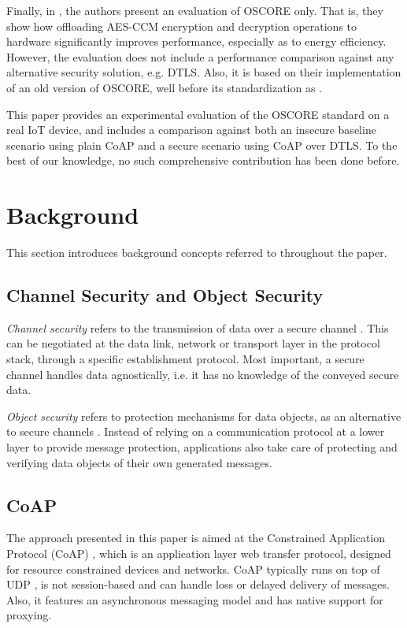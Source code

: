{Finally, in \cite{musaddiq2018}, the authors present an evaluation of OSCORE only. That is, they show how offloading AES-CCM encryption and decryption operations to hardware significantly improves performance, especially as to energy efficiency. However, the evaluation does not include a performance comparison against any alternative security solution, e.g. DTLS. Also, it is based on their implementation of an old version of OSCORE, well before its standardization as \cite{cite:oscoap}. 

This paper provides an experimental evaluation of the OSCORE standard on a real IoT device, and includes a comparison against both an insecure baseline scenario using plain CoAP and a secure scenario using CoAP over DTLS. To the best of our knowledge, no such comprehensive contribution has been done before.

\section{Background}
\label{sec:back}

This section introduces background concepts referred to throughout the paper.

\subsection{Channel Security and Object Security }
\emph{Channel security} refers to the transmission of data over a secure channel \cite{rfc3552}. This can be negotiated at the data link, network or transport layer in the protocol stack, through a specific establishment protocol. Most important, a secure channel handles data agnostically, i.e. it has no knowledge of the conveyed secure data.

\emph{Object security} refers to protection mechanisms for data objects, as an alternative to secure channels \cite{rfc3552}. Instead of relying on a communication protocol at a lower layer to provide message protection, applications also take care of protecting and verifying data objects of their own generated messages.

\subsection{CoAP}\label{coap}
The approach presented in this paper is aimed at the Constrained Application Protocol (CoAP) \cite{rfc7252}, which is an application layer web transfer protocol, designed for resource constrained devices and networks. CoAP typically runs on top of UDP \cite{rfc768}, is not session-based and can handle loss or delayed delivery of messages. Also, it features an asynchronous messaging model and has native support for proxying. 

}
